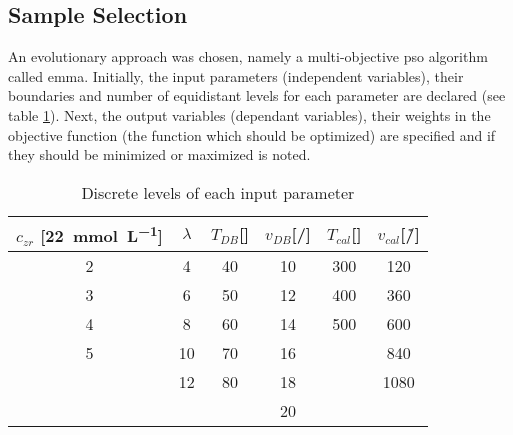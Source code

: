\subsection{Sample Selection}
\label{sec:ss}
An evolutionary approach was chosen, namely a multi-objective 
\gls{pso} algorithm called \gls{emma}\cite{villanova2010function,Kennedy1995,Breiman1997,Carta2011}.
%
%
Initially, the input parameters (independent variables), their boundaries and number of equidistant levels for each parameter are declared (see table \ref{tab:input}).
Next, the output variables (dependant variables), their weights in the objective function (the function which should be optimized) are specified and if they should be minimized or maximized is noted.
%
\begin{table}[htb]
	\centering
	\begin{tabular}{cc cc cc}
		\hline
        $c_{zr}$ [\SI{22}{\milli\mol\per\liter}]	&$\lambda$	&$T_{DB}$[\oc{}]	&$v_{DB}$[\mm{}/\s{}]	&$T_{cal}$[\oc{}]	&$v_{cal}$[\oc{}/\h{}]	\\
		\hline
		2				&4		&40					&10				&300				&120	\\
		3				&6		&50					&12				&400				&360	\\
		4				&8		&60					&14				&500				&600	\\
		5				&10		&70					&16				&					&840	\\
						&12		&80					&18				&					&1080	\\
						&		&					&20				&					&		\\
		\hline
	\end{tabular}
	\caption{Discrete levels of each input parameter }
	\label{tab:input}
\end{table}

